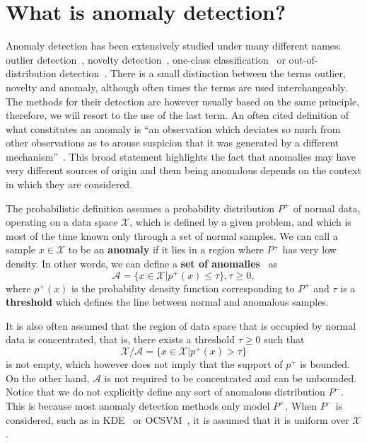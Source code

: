 \section{What is anomaly detection?}
Anomaly detection has been extensively studied under many different names: outlier detection~\cite{knorr98algorithms,hodge2004survey}, novelty detection~\cite{pimentel2014review}, one-class classification~\cite{ruff2018deep} or out-of-distribution detection~\cite{liang2017enhancing}. There is a small distinction between the terms outlier, novelty and anomaly, although often times the terms are used interchangeably. The methods for their detection are however usually based on the same principle, therefore, we will resort to the use of the last term. An often cited definition of what constitutes an anomaly is ``an observation which deviates so much from other observations as to arouse suspicion that it was generated by a different mechanism''~\cite{barnett1974outliers}. This broad statement highlights the fact that anomalies may have very different sources of origin and them being anomalous depends on the context in which they are considered. 

The probabilistic definition assumes a probability distribution $P^+$ of normal data, operating on a data space $\mathcal{X}$, which is defined by a given problem, and which is most of the time known only through a set of normal samples. We can call a sample $x \in \mathcal{X}$ to be an \textbf{anomaly} if it lies in a region where $P^+$ has very low density. In other words, we can define a \textbf{set of anomalies}~\cite{ruff2020unifying} as 
\begin{equation} \label{eq:anomaly_set}
	\mathcal{A} = \lbrace x \in \mathcal{X} \vert p^+(x) \leq \tau \rbrace, \tau \geq 0,
\end{equation}
where $p^+(x)$ is the probability density function corresponding to $P^+$ and $\tau$ is a \textbf{threshold} which defines the line between normal and anomalous samples. 

It is also often assumed that the region of data space that is occupied by normal data is concentrated, that is, there exists a threshold $\tau \geq 0$ such that
\begin{equation} \label{eq:normal_concentration}
	\mathcal{X} \slash \mathcal{A} = \lbrace x \in \mathcal{X} \vert p^+(x) > \tau \rbrace
\end{equation}
is not empty, which however does not imply that the support of $p^+$ is bounded. On the other hand, $\mathcal{A}$ is not required to be concentrated and can be unbounded. Notice that we do not explicitly define any sort of anomalous distribution $P^-$. This is because most anomaly detection methods only model $P^+$. When $P^-$ is considered, such as in KDE~\cite{parzen1962estimation} or OCSVM~\cite{scholkopf2001estimating}, it is assumed that it is uniform over $\mathcal{X}$. 

